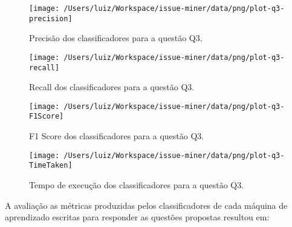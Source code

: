 \documentclass[11pt,twoside]{article}
\begin{document}
\pagebreak
\begin{figure}[!ht]
\centering
  \texttt{[image: /Users/luiz/Workspace/issue-miner/data/png/plot-q3-precision]}
  \caption{Precisão dos classificadores para a questão Q3.}
\end{figure}

\pagebreak
\begin{figure}[!ht]
\centering
  \texttt{[image: /Users/luiz/Workspace/issue-miner/data/png/plot-q3-recall]}
  \caption{Recall dos classificadores para a questão Q3.}
\end{figure}

\pagebreak
\begin{figure}[!ht]
\centering
  \texttt{[image: /Users/luiz/Workspace/issue-miner/data/png/plot-q3-F1Score]}
  \caption{F1 Score dos classificadores para a questão Q3.}
\end{figure}

\pagebreak
\begin{figure}[!ht]
\centering
  \texttt{[image: /Users/luiz/Workspace/issue-miner/data/png/plot-q3-TimeTaken]}
  \caption{Tempo de execução dos classificadores para a questão Q3.}
\end{figure}


\pagebreak
A avaliação as métricas produzidas pelos classificadores de cada máquina de 
aprendizado escritas para responder as questões propostas resultou em:
\end{document}
